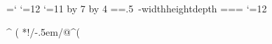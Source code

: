 \usepackage{xy}


\def\dated#1{\def\thedate{#1}}%
\dated{2015-09-26}%
\newcount\atcode \atcode=\catcode`\@%
\catcode`\@=12%
\relax
{}
\catcode`\@=11
 \newdimen\xydashw@@
 \xydashw@@\xydashw@
 \multiply\xydashw@@ by 7
 \divide\xydashw@@ by 4
\setbox\zerodotbox@=\hbox{\dimen@=.5\xydashw@@
 \kern-\dimen@ \vrule width\xydashw@@ height\dimen@ depth\dimen@}
\wd\zerodotbox@=\z@ \ht\zerodotbox@=\z@ \dp\zerodotbox@=\z@
\catcode`\@=12

\newdir{ >>}{{}*!/-2.6667\jot/\dir{>>}}
%
\newdir^{ (}{{ }*!/-.5em/@^{(}}%
%
%
%

\newdimen\high%
\newdimen\ul%
\newcount\deltax%
\newcount\deltay%
\newcount\deltaX%
\newcount\deltaXprime%
\newcount\deltaY%
\newcount\deltaYprime%

\newdimen\wdth%
\newcount\xend%
\newcount\yend%
\newcount\Xend%
\newcount\Yend%
\newcount\xpos%
\newcount\ypos%
\newcount{} {}%
\newcount{} {}%
\newcount\topw%
\newcount\botw%
\newcount\Xpos%
\newcount\Ypos%
\def\ratchet#1#2{\ifnum#1<#2\global #1=#2\fi}%

